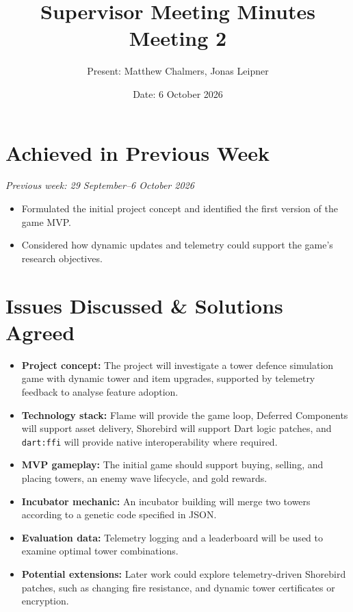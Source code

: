 \documentclass[12pt,a4paper]{article}
\title{\textbf{Supervisor Meeting Minutes}\\Meeting 2}
\author{Present: Matthew Chalmers, Jonas Leipner}
\date{Date: 6 October 2026}
\begin{document}
\maketitle

\section{Achieved in Previous Week}

\noindent\textit{Previous week: 29 September--6 October 2026}
\begin{itemize}[leftmargin=*]
    \item Formulated the initial project concept and identified the first version of the game MVP.
    \item Considered how dynamic updates and telemetry could support the game's research objectives.
\end{itemize}

\section{Issues Discussed \& Solutions Agreed}

\begin{itemize}[leftmargin=*]
    \item \textbf{Project concept:} The project will investigate a tower defence simulation game with dynamic tower and item upgrades, supported by telemetry feedback to analyse feature adoption.
    \item \textbf{Technology stack:} Flame will provide the game loop, Deferred Components will support asset delivery, Shorebird will support Dart logic patches, and \texttt{dart:ffi} will provide native interoperability where required.
    \item \textbf{MVP gameplay:} The initial game should support buying, selling, and placing towers, an enemy wave lifecycle, and gold rewards.
    \item \textbf{Incubator mechanic:} An incubator building will merge two towers according to a genetic code specified in JSON.
    \item \textbf{Evaluation data:} Telemetry logging and a leaderboard will be used to examine optimal tower combinations.
    \item \textbf{Potential extensions:} Later work could explore telemetry-driven Shorebird patches, such as changing fire resistance, and dynamic tower certificates or encryption.
\end{itemize}
\end{document}
